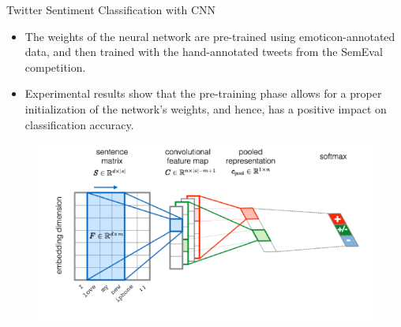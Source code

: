 \documentclass[handout]{beamer}
\begin{document}
\begin{frame}{Twitter Sentiment Classification with CNN}
\begin{scriptsize}
\begin{itemize}
\item  The weights of the neural network are pre-trained using emoticon-annotated data, and then trained with the hand-annotated tweets from the SemEval competition.
\item   Experimental results show that the pre-training phase allows for a proper initialization of the network's weights, and hence, has a positive impact on classification accuracy. 
\end{itemize}
  \begin{figure}[h]
        	\includegraphics[scale = 0.45]{pics/cnn-twitter.png}
        \end{figure}
\end{scriptsize}
\end{frame}
\end{document}
